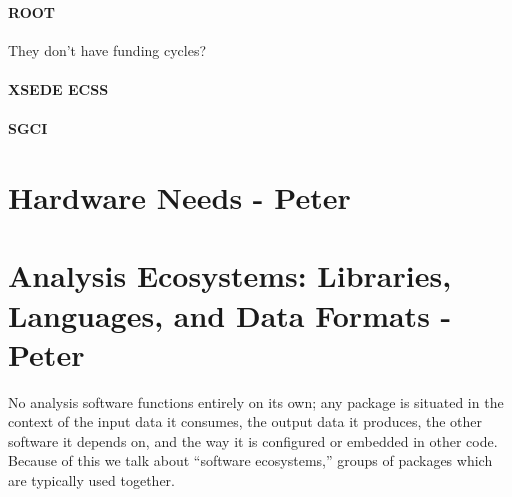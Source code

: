 \paragraph{ROOT}
They don't have funding cycles?

\paragraph{XSEDE ECSS}

\paragraph{SGCI}


\section{Hardware Needs - Peter}


\section{Analysis Ecosystems: Libraries, Languages, and Data Formats - Peter}
No analysis software functions entirely on its own; any package is situated in the context of the input data it consumes, the output data it produces, the other software it depends on, and the way it is configured or embedded in other code. Because of this we talk about ``software ecosystems,'' groups of packages which are typically used together.

